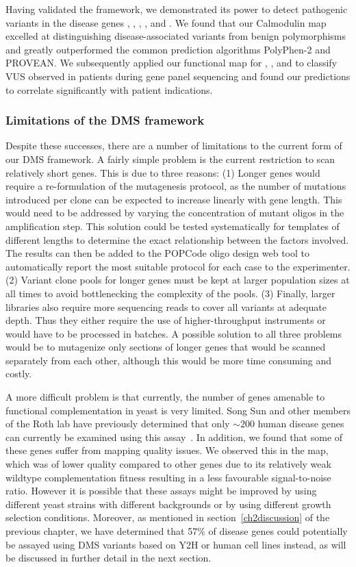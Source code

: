 Having validated the framework, we demonstrated its power to detect pathogenic variants in the disease genes , , , , and .  
We found that our Calmodulin map excelled at distinguishing disease-associated variants from benign polymorphisms and greatly outperformed the common prediction algorithms PolyPhen-2 and PROVEAN. We subsequently applied our functional map for , , and  to classify VUS observed in patients during gene panel sequencing and found our predictions to correlate significantly with patient indications.

\subsubsection{Limitations of the DMS framework}
Despite these successes, there are a number of limitations to the current form of our DMS framework. A fairly simple problem is the current restriction to scan relatively short genes. This is due to three reasons: (1) Longer genes would require a re-formulation of the mutagenesis protocol, as the number of mutations introduced per clone can be expected to increase linearly with gene length. This would need to be addressed by varying the concentration of mutant oligos in the amplification step. This solution could be tested systematically for templates of different lengths to determine the exact relationship between the factors involved. The results can then be added to the POPCode oligo design web tool to automatically report the most suitable protocol for each case to the experimenter.
(2) Variant clone pools for longer genes must be kept at larger population sizes at all times to avoid bottlenecking the complexity of the pools.
(3) Finally, larger libraries also require more sequencing reads to cover all variants at adequate depth. Thus they either require the use of higher-throughput instruments or would have to be processed in batches. 
A possible solution to all three problems would be to mutagenize only sections of longer genes that would be scanned separately from each other, although this would be more time consuming and costly.

A more difficult problem is that currently, the number of genes amenable to functional complementation in yeast is very limited. Song Sun and other members of the Roth lab have previously determined that only $\sim 200$ human disease genes can currently be examined using this assay~\cite{sun_extended_2016}. In addition, we found that some of these genes suffer from mapping quality issues. We observed this in the  map, which was of lower quality compared to other genes due to its relatively weak wildtype complementation fitness resulting in a less favourable signal-to-noise ratio. However it is possible that these assays might be improved by using different yeast strains with different backgrounds or by using different growth selection conditions.
Moreover, as mentioned in section~\ref{ch2discussion} of the previous chapter, we have determined that 57\% of disease genes could potentially be assayed using DMS variants based on Y2H or human cell lines instead, as will be discussed in further detail in the next section.


